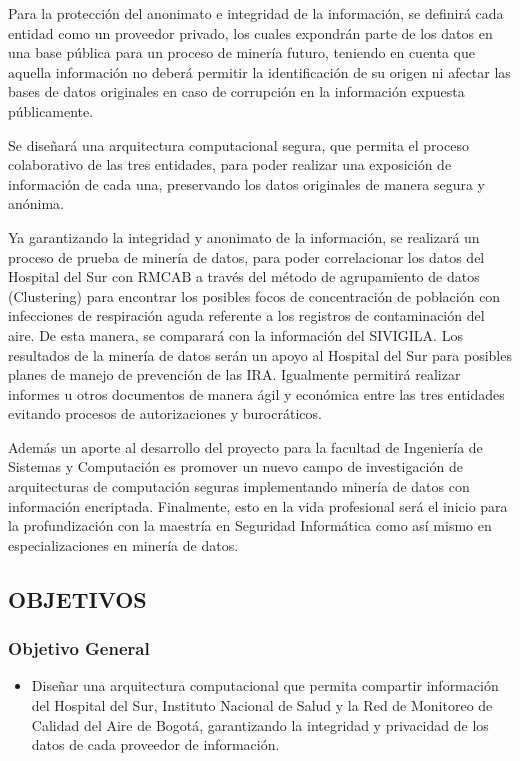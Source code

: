 \documentclass[a4paper, 12pt, oneside]{article}
\theoremstyle{definition}
\theoremstyle{remark}
\begin{document}
Para la protección del anonimato e integridad de la información, se definirá cada entidad como un proveedor privado, los cuales expondrán parte de los datos en una base pública para un proceso de minería futuro, teniendo en cuenta que aquella información no deberá permitir la identificación de su origen ni afectar las bases de datos originales en caso de corrupción en la información expuesta públicamente.

Se diseñará una arquitectura computacional segura, que permita el proceso colaborativo de las tres entidades, para poder realizar una exposición de información de cada una, preservando los datos originales de manera segura y anónima.

Ya garantizando la integridad y anonimato de la información, se realizará un proceso de prueba de minería de datos, para poder correlacionar los datos del Hospital del Sur con RMCAB a través del método de agrupamiento de datos (Clustering) para encontrar los posibles focos de concentración de población con infecciones de respiración aguda referente a los registros de contaminación del aire. De esta manera, se comparará con la información del SIVIGILA. Los resultados de la minería de datos serán un apoyo  al Hospital del Sur para posibles planes de manejo de prevención de las IRA. Igualmente permitirá realizar informes u otros documentos de manera ágil y económica entre las tres entidades evitando procesos de autorizaciones y burocráticos.

Además un aporte al desarrollo del proyecto para la facultad de Ingeniería de Sistemas y Computación es promover un nuevo campo de investigación de arquitecturas de computación seguras implementando minería de datos con información encriptada. Finalmente, esto en la vida profesional será el inicio para la profundización con la maestría en Seguridad Informática como así mismo en especializaciones en minería de datos.

\subsection{OBJETIVOS}

\subsubsection{Objetivo General}
\begin{itemize}
\item Diseñar una arquitectura computacional que permita compartir información del Hospital del Sur, Instituto Nacional de Salud y la Red de Monitoreo de Calidad del Aire de Bogotá, garantizando la integridad y privacidad de los datos de cada proveedor de información.
\end{itemize}
\end{document}
